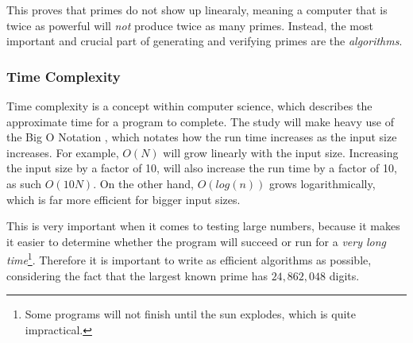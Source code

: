 \documentclass[main.tex]{subfiles}
\begin{document}
This proves that primes do not show up linearaly, meaning a computer that is twice as powerful will \textit{not} produce twice as many primes. Instead, the most important and crucial part of generating and verifying primes are the \textit{algorithms}.

\subsubsection{Time Complexity}

Time complexity \cite{theorem:time_comp} is a concept within computer science, which describes the approximate time for a program to complete. The study will make heavy use of the Big O Notation \cite{theorem:big_O}, which notates how the run time increases as the input size increases. For example, $O(N)$ will grow linearly with the input size. Increasing the input size by a factor of 10, will also increase the run time by a factor of 10, as such $O(10N)$. On the other hand, $O(log(n))$ grows logarithmically, which is far more efficient for bigger input sizes. 

This is very important when it comes to testing large numbers, because it makes it easier to determine whether the program will succeed or run for a \textit{very long time}\footnote{Some programs will not finish until the sun explodes, which is quite impractical.}. Therefore it is important to write as efficient algorithms as possible, considering the fact that the largest known prime has $24,862,048$ digits. 

\end{document}
